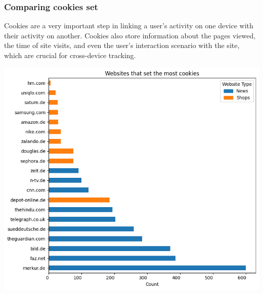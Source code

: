 \subsubsection{Comparing cookies set}
Cookies are a very important step in linking a user's activity on one device with their activity on another. Cookies also store information about the pages viewed, the time of site visits, and even the user's interaction scenario with the site, which are crucial for cross-device tracking.

\vspace{0.8cm}
\noindent 
\begin{minipage}{0.6\textwidth} 
    \includegraphics[width=\linewidth]{./assets/comparison21.png}
\end{minipage}
\hfill 
